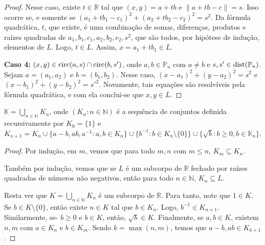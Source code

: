 \begin{proof}
    Nesse caso, existe $t \in \mathbb R$ tal que $(x, y)=a+tb$ e $\|a+tb-c\|=s$. Isso ocorre se, e somente se $(a_1+tb_1-c_1)^2+(a_2+tb_2-c_2)^2=s^2$.
    Da fórmula quadrática, $t$, que existe, é uma combinação de somas, diferenças, produtos e raízes quadradas de $a_1, b_1, c_1, a_2, b_2, c_2, s^2$, que são todos, por hipótese de indução, elementos de $L$. Logo, $t \in L$. Assim, $x=a_1+tb_1\in L$.

    \textbf{Caso 4:} $(x, y)\in \operatorname{circ}(a, s)\cap \operatorname{circ}(b, s')$, onde $a, b \in \mathbb P_n$ com $a\neq b$ e $s, s' \in \operatorname{dist}(\mathbb P_n)$. Sejam $a=(a_1, a_2)$ e $b=(b_1, b_2)$.
    Nesse caso, $(x-a_1)^2+(y-a_2)^2=s^2$ e $(x-b_1)^2+(y-b_2)^2=s'^2$. Novamente, tais equações são resolvíveis pela fórmula quadrática, e com ela conclui-se que $x, y \in L$.
\end{proof}


\begin{lemma}
    $\mathbb K=\bigcup_{n \in \mathbb N} K_n$, onde $(K_n: n \in \mathbb N)$ é a sequência de conjuntos definida recursivamente por $K_0=\{1\}$ e $K_{n+1}=K_n\cup\{a-b, ab, a^{-1}: a, b \in K_n\}\cup\{b^{-1}: b\in K_n\setminus\{0\}\}\cup \{\sqrt b: b\geq 0, b \in \mathbb K_n\}$.
\end{lemma}

\begin{proof}
    Por indução, em $m$, vemos que para todo $m, n$ com $m\leq n$, $K_m\subseteq K_n$.

    Também por indução, vemos que se $L$ é um subcorpo de $\mathbb R$ fechado por raízes quadradas de números não negativos, então para todo $n\in \mathbb N$, $K_n\subseteq L$.

    Resta ver que $K=\bigcup_{n \in \mathbb N}K_n$ é um subcorpo de $\mathbb R$. Para tanto, note que $1 \in K$. Se $b\in K\setminus \{0\}$, então existe $n \in K$ tal que $b\in K_n$. Logo, $b^{-1} \in K_{n+1}$. Similarmente, se- $b\geq 0$ e $b \in K$, então, $\sqrt b \in K$. Finalmente, se $a, b \in K$, existem $n, m$ com $a\in K_n$ e $b\in K_m$. Sendo $k=\max(n, m)$, temos que $a-b, ab \in K_{k+1}$.     
\end{proof}

